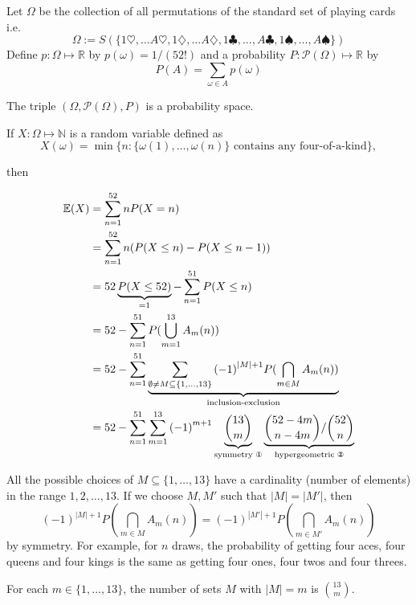 \documentclass[6pt]{article}
\begin{document}
\begin{tcolorbox}[title=\text{The Standard Probability Space for Playing Cards}]
Let $\Omega$ be the collection of all permutations of the standard set of playing cards i.e.
  \[
      \Omega := S(\{1\heartsuit, \ldots A\heartsuit,1\diamondsuit,\ldots A\diamondsuit, 1\clubsuit,\ldots,A\clubsuit,1\spadesuit,\ldots,A\spadesuit\})
  \]
Define $p: \Omega \mapsto \mathbb{R}$ by $p(\omega) = 1/(52!)$
and a probability $P: \mathcal{P}(\Omega) \mapsto \mathbb{R}$  by
\[
    P(A) = \sum_{\omega \in A}p(\omega)
\]

The triple $(\Omega, \mathcal{P}(\Omega), P )$ is a probability space.
\end{tcolorbox}

\clearpage

\begin{tcolorbox}
If $X: \Omega \mapsto \mathbb{N}$ is a random variable defined as
\[
X(\omega) = \min \{ n : \{\omega(1),\ldots,\omega(n)\} \text{ contains any four-of-a-kind}\},
\]

then

\begin{align*}
\mathbb{E}(X) &= \sum_{n = 1}^{52} n P(X  = n)\\
&= \sum_{n=1}^{52} n (P(X \leq n) - P(X \leq n -1)) \\
&= 52\underbrace{P(X \leq 52)}_{= 1} - \sum_{n=1}^{51} P(X\leq n) \\
&= 52 - \sum_{n=1}^{51} P(\bigcup_{m=1}^{13} A_m(n)) \\
& = 52 - \sum_{n=1}^{51} \underbrace{\sum_{\emptyset \neq M \subseteq \{1,\ldots,13\}} {(-1)}^{|M| + 1} P(\bigcap_{m \in M} A_m(n))}_{\text{inclusion-exclusion}} \\
& = 52 - \sum_{n = 1}^{51}\sum_{m = 1}^{13}  {(-1)}^{m+1}\underbrace{{13 \choose m}}_{\text{symmetry \ding{172}}} \underbrace{{52 -4m \choose n - 4m}/{52 \choose n}}_{\text{hypergeometric \ding{173}}} \\
\end{align*}
\end{tcolorbox}
\clearpage

\begin{tcolorbox}[title=\text{Symmetry \ding{172}}]
All the possible choices of $M \subseteq \{1, \ldots, 13\}$ have a cardinality (number of elements) in the range $1, 2, \ldots, 13$. If we choose $M, M'$ such that $|M| = |M'|$, then
\[
{(-1)}^{|M| + 1} P(\bigcap_{m \in M} A_m(n)) =  {(-1)}^{|M'| + 1} P(\bigcap_{m \in M'} A_m(n))
 \]
by symmetry. For example, for $n$ draws, the probability of getting four aces, four queens and four kings is the same as getting four ones, four twos and four threes.

For each $m \in \{1, \ldots, 13\}$, the number of sets $M$ with $|M|=m$ is ${13 \choose m}$.
\end{tcolorbox}
\end{document}
